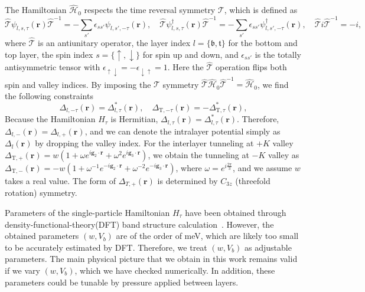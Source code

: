 \documentclass[aps,prl,onecolumn,superscriptaddress,longbibliography]{revtex4-2}
\begin{document}
The Hamiltonian $\hat{\mathcal{H}}_0$ respects the time reversal symmetry $\mathcal{T}$, which is defined as  
\begin{equation}\label{eq:Ham}
    \hat{\mathcal{T}} \psi_{l,s,\tau}(\bm{r}) \hat{\mathcal{T}}^{-1} = - \sum_{s'}\epsilon_{ss'} \psi_{l,s',-\tau}(\bm{r}),\quad
    \hat{\mathcal{T}} \psi_{l,s,\tau}^{\dagger}(\bm{r}) \hat{\mathcal{T}}^{-1} = - \sum_{s'}\epsilon_{ss'} \psi_{l,s',-\tau}^{\dagger}(\bm{r})
     ,\quad 
     \hat{\mathcal{T}}i\hat{\mathcal{T}}^{-1}=-i,
\end{equation} 
where $\hat{\mathcal{T}}$ is an antiunitary operator, the layer index $l=\{\mathfrak{b},\mathfrak{t}\}$ for the bottom and top layer, the spin index $s=\{\uparrow, \downarrow\}$ for spin up and down, and $\epsilon_{ss'}$ is the totally antisymmetric tensor with $\epsilon_{\uparrow \downarrow} = - \epsilon_{\downarrow \uparrow} =1$. Here the $\hat{\mathcal{T}}$ operation flips both spin and valley indices.
By imposing the $\mathcal{T}$ symmetry $\hat{\mathcal{T}} \hat{\mathcal{H}}_0 \hat{\mathcal{T}}^{-1} = \hat{\mathcal{H}}_0$, we find the following constraints 
\begin{equation}
    \Delta_{l,-\tau}(\bm{r})=\Delta_{l,\tau}^*(\bm{r}), \quad 
    \Delta_{\text{T},-\tau}(\bm{r})=-\Delta_{\text{T},\tau}^*(\bm{r}),
\end{equation}
Because the Hamiltonian $H_{\tau}$ is Hermitian, $\Delta_{l,\tau}(\bm{r})=\Delta_{l,\tau}^*(\bm{r})$. Therefore, $\Delta_{l,-}(\bm{r})=\Delta_{l,+}(\bm{r})$, and we can denote the intralayer potential simply as $\Delta_{l}(\bm{r})$ by dropping the valley index. For the interlayer tunneling at $+K$ valley $\Delta_{\text{T},+}(\bm{r})=w\left(1+\omega e^{i\bm{g}_2\cdot\bm{r}}+\omega^{2} e^{i\bm{g}_3\cdot\bm{r}} \right)$, we obtain the tunneling at $-K$ valley as $\Delta_{\text{T},-}(\bm{r})=-w\left(1+\omega^{-1} e^{-i\bm{g}_2\cdot\bm{r}}+\omega^{-2} e^{-i\bm{g}_3\cdot\bm{r}} \right)$, where $\omega=e^{i\frac{2\pi}{3}}$, and we assume $w$ takes a real value. The form of $\Delta_{T,+}(\bm{r})$ is determined by $C_{3z}$ (threefold rotation) symmetry.

Parameters of the single-particle Hamiltonian $H_{\tau}$ have been obtained through density-functional-theory(DFT) band structure calculation~\cite{zhang2021spintextured}. However, the obtained parameters $(w, V_b)$ are of the order of meV, which are likely too small to be accurately estimated by DFT. Therefore, we treat $(w, V_b)$ as adjustable parameters. The main physical picture that we obtain in this work remains valid if we vary $(w, V_b)$, which we have checked numerically. In addition, these parameters could be tunable by pressure applied between layers.
\end{document}
